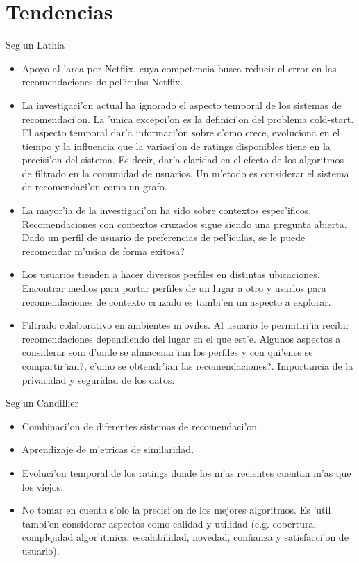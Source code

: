 \documentclass[11pt]{article}
\begin{document}
\section{Tendencias}
Seg'un Lathia~\cite{recsys:nlathia}\\
\begin{itemize}
\item Apoyo al 'area por Netflix, cuya competencia busca reducir el error en las recomendaciones de pel'iculas Netflix.
\item La investigaci'on actual ha ignorado el aspecto temporal de los sistemas de recomendaci'on. La 'unica excepci'on es la definici'on del problema cold-start. El aspecto temporal dar'a informaci'on sobre c'omo crece, evoluciona en el tiempo y la influencia que la variaci'on de ratings disponibles tiene en la precisi'on del sistema. Es decir, dar'a claridad en el efecto de los algoritmos de filtrado en la comunidad de usuarios. Un m'etodo es considerar el sistema de recomendaci'on como un grafo.
\item La mayor'ia de la investigaci'on ha sido sobre contextos espec'ificos. Recomendaciones con contextos cruzados sigue siendo una pregunta abierta. Dado un perfil de usuario de preferencias de pel'iculas, se le puede recomendar m'usica de forma exitosa?
\item Los usuarios tienden a hacer diversos perfiles en distintas ubicaciones. Encontrar medios para portar perfiles de un lugar a otro y usarlos para recomendaciones de contexto cruzado es tambi'en un aspecto a explorar.
\item Filtrado colaborativo en ambientes m'oviles. Al usuario le permitiri'ia recibir recomendaciones dependiendo del lugar en el que est'e. Algunos aspectos a considerar son: \textquestiondown d'onde se almacenar'ian los perfiles y con qui'enes se compartir'ian?, \textquestiondown c'omo se obtendr'ian las recomendaciones?. Importancia de la privacidad y seguridad de los datos.
\end{itemize}

Seg'un Candillier~\cite{start:candillier09}\\
\begin{itemize}
\item Combinaci'on de diferentes sistemas de recomendaci'on.
\item Aprendizaje de m'etricas de similaridad.
\item Evoluci'on temporal de los ratings donde los m'as recientes cuentan m'as que los viejos.
\item No tomar en cuenta s'olo la precisi'on de los mejores algoritmos. Es 'util tambi'en considerar aspectos como calidad y utilidad (e.g. cobertura, complejidad algor'itmica, escalabilidad, novedad, confianza y satisfacci'on de usuario).
\end{itemize}
\end{document}
